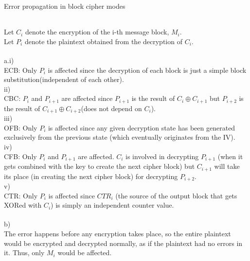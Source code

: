 \documentclass{assignment}
\begin{document}
\begin{problemlist}
\pbitem Error propagation in block cipher modes
\begin{problem}
\begin{answer}
\\
Let $C_i$ denote the encryption of the i-th message block, $M_i$.\\
Let $P_i$ denote the plaintext obtained from the decryption of $C_i$.\\
\\
a.i)\\
ECB: Only $P_i$ is affected since the decryption of each block is just a simple block substitution(independent of each other).\\
ii)\\CBC: $P_i$ and $P_{i+1}$ are affected since $P_{i+1}$ is the result of $C_i \oplus C_{i+1}$ but $P_{i+2}$ is the result of  $C_{i+1} \oplus C_{i+2}$(does not depend on $C_i$).\\
iii)\\
OFB: Only $P_i$ is affected since any given decryption state has been generated exclusively from the previous state (which eventually originates from the IV).\\
iv)\\
CFB: Only $P_i$ and $P_{i+1}$ are affected.  $C_i$ is involved in decrypting $P_{i+1}$ (when it gets combined with the key to create the next cipher block) but $C_{i+1}$ will take its place (in creating the next cipher block) for decrypting $P_{i+2}$.\\
v)\\
CTR: Only $P_i$ is affected since $CTR_i$ (the source of the output block that gets XORed with $C_i$) is simply an independent counter value.\\
\\
b)\\
The error happens before any encryption takes place, so the entire plaintext would be encrypted and decrypted normally, as if the plaintext had no errors in it.  Thus, only $M_i$ would be affected.\\
\\
\end{answer}
\end{problem}

\end{problemlist}
\end{document}
